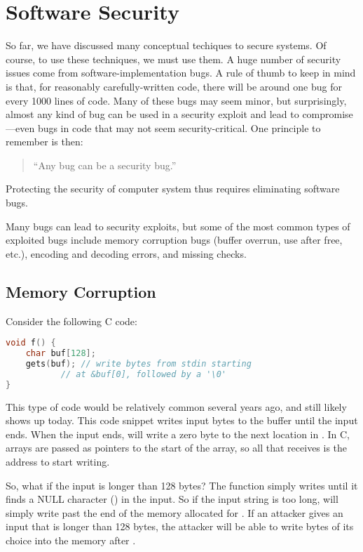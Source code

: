 \chapter{Software Security}

So far, we have discussed many conceptual techiques to secure systems. 
Of course, to use these techniques, we must use
them. A huge number of security issues come from
software-implementation bugs.
A rule of thumb to keep in mind is that, for reasonably
carefully-written code, there will be around one
bug for every 1000 lines of code. Many of these
bugs may seem minor, but surprisingly, almost any
kind of bug can be used in a security exploit and
lead to compromise---even bugs in code that may
not seem security-critical. One principle to remember
is then:
\begin{quote}
``Any bug can be a security bug.''
\end{quote}
Protecting the security of computer system thus requires
eliminating software bugs. 

Many bugs can lead to security exploits, but some
of the most common types of exploited bugs include
memory corruption bugs (buffer overrun, use after free, etc.), 
encoding and decoding errors,
and missing checks.

\section{Memory Corruption}
Consider the following C code:

\begin{lstlisting}[language=c]
void f() {
	char buf[128];
	gets(buf); // write bytes from stdin starting
		   // at &buf[0], followed by a '\0'
}
\end{lstlisting}

This type of code would be relatively common several years ago, and still likely
shows up today. This code snippet writes input bytes to the buffer until the input ends. When
the input ends,  will write a zero byte to the next location in
. In C, arrays are passed as pointers to the start of the array, so all
that  receives is the address to start writing.

So, what if the input is longer than 128 bytes? The  function simply writes until
it finds a NULL character () in the input. 
So if the input string is too long,  will simply write past
the end of the memory allocated for . 
If an attacker gives an input that is longer than 128 bytes,
the attacker will be able to write bytes of its choice into the 
memory after .

